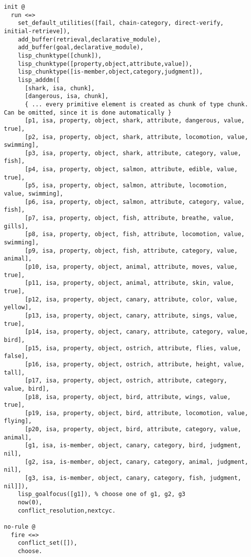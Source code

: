 \begin{lstlisting}[caption={Translated production rules for the semantic model in CHR}]
init @
  run <=>
    set_default_utilities([fail, chain-category, direct-verify, initial-retrieve]),
    add_buffer(retrieval,declarative_module),
    add_buffer(goal,declarative_module),
    lisp_chunktype([chunk]),
    lisp_chunktype([property,object,attribute,value]),
    lisp_chunktype([is-member,object,category,judgment]),
    lisp_adddm([
      [shark, isa, chunk],
      [dangerous, isa, chunk],
      { ... every primitive element is created as chunk of type chunk. Can be omitted, since it is done automatically }
      [p1, isa, property, object, shark, attribute, dangerous, value, true], 
      [p2, isa, property, object, shark, attribute, locomotion, value, swimming], 
      [p3, isa, property, object, shark, attribute, category, value, fish], 
      [p4, isa, property, object, salmon, attribute, edible, value, true], 
      [p5, isa, property, object, salmon, attribute, locomotion, value, swimming], 
      [p6, isa, property, object, salmon, attribute, category, value, fish], 
      [p7, isa, property, object, fish, attribute, breathe, value, gills], 
      [p8, isa, property, object, fish, attribute, locomotion, value, swimming], 
      [p9, isa, property, object, fish, attribute, category, value, animal], 
      [p10, isa, property, object, animal, attribute, moves, value, true], 
      [p11, isa, property, object, animal, attribute, skin, value, true], 
      [p12, isa, property, object, canary, attribute, color, value, yellow], 
      [p13, isa, property, object, canary, attribute, sings, value, true], 
      [p14, isa, property, object, canary, attribute, category, value, bird], 
      [p15, isa, property, object, ostrich, attribute, flies, value, false], 
      [p16, isa, property, object, ostrich, attribute, height, value, tall], 
      [p17, isa, property, object, ostrich, attribute, category, value, bird], 
      [p18, isa, property, object, bird, attribute, wings, value, true], 
      [p19, isa, property, object, bird, attribute, locomotion, value, flying], 
      [p20, isa, property, object, bird, attribute, category, value, animal], 
      [g1, isa, is-member, object, canary, category, bird, judgment, nil], 
      [g2, isa, is-member, object, canary, category, animal, judgment, nil], 
      [g3, isa, is-member, object, canary, category, fish, judgment, nil]]), 
    lisp_goalfocus([g1]), % choose one of g1, g2, g3
    now(0),
    conflict_resolution,nextcyc.

no-rule @
  fire <=>
    conflict_set([]),
    choose.
\end{lstlisting}

